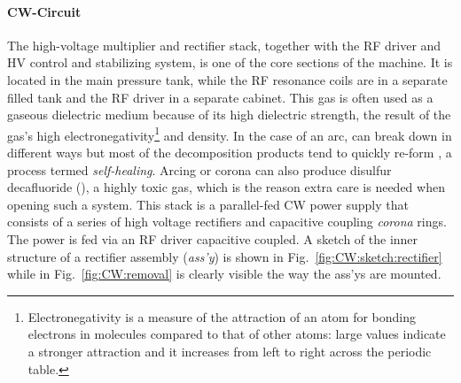 \begin{refsection}
        \paragraph{CW-Circuit}
        The high-voltage multiplier and rectifier stack, together with the RF driver and HV control and stabilizing system, is one of the core sections of the machine.
        It is located in the main pressure tank, while the RF resonance coils are in a separate  filled tank and the RF driver in a separate cabinet.
        This gas is often used as a gaseous dielectric medium because of its high dielectric strength, the result of the gas's high electronegativity\footnote{Electronegativity is a measure of the attraction of an atom for bonding electrons in molecules compared to that of other atoms: large values indicate a stronger attraction and it increases from left to right across the periodic table.} and density.
        In the case of an arc,  can break down in different ways but most of the decomposition products tend to quickly re-form , a process termed \textit{self-healing}. 
        Arcing or corona can also produce disulfur decafluoride (), a highly toxic gas, which is the reason extra care is needed when opening such a system.
        This stack is a parallel-fed CW power supply that consists of a series of high voltage rectifiers and capacitive coupling \textit{corona} rings.
        The power is fed via an RF driver capacitive coupled.
        A sketch of the inner structure of a rectifier assembly (\textit{ass'y}) is shown in Fig.~\ref{fig:CW:sketch:rectifier} while in Fig.~\ref{fig:CW:removal} is clearly visible the way the ass'ys are mounted.


\end{refsection}
